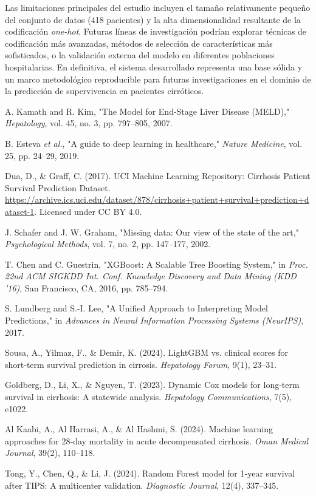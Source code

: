 \documentclass[journal]{IEEEtai}
\begin{document}
Las limitaciones principales del estudio incluyen el tamaño relativamente pequeño del conjunto de datos (418 pacientes) y la alta dimensionalidad resultante de la codificación \textit{one-hot}. Futuras líneas de investigación podrían explorar técnicas de codificación más avanzadas, métodos de selección de características más sofisticados, o la validación externa del modelo en diferentes poblaciones hospitalarias. En definitiva, el sistema desarrollado representa una base sólida y un marco metodológico reproducible para futuras investigaciones en el dominio de la predicción de supervivencia en pacientes cirróticos.

\begin{thebibliography}{1}

A. Kamath and R. Kim, "The Model for End-Stage Liver Disease (MELD)," \textit{Hepatology}, vol. 45, no. 3, pp. 797--805, 2007.

B. Esteva \textit{et al.}, "A guide to deep learning in healthcare," \textit{Nature Medicine}, vol. 25, pp. 24--29, 2019.

Dua, D., \& Graff, C. (2017). UCI Machine Learning Repository: Cirrhosis Patient Survival Prediction Dataset.
\url{https://archive.ics.uci.edu/dataset/878/cirrhosis+patient+survival+prediction+dataset-1}. Licensed under CC BY 4.0.

J. Schafer and J. W. Graham, "Missing data: Our view of the state of the art," \textit{Psychological Methods}, vol. 7, no. 2, pp. 147--177, 2002.

T. Chen and C. Guestrin, "XGBoost: A Scalable Tree Boosting System," in \textit{Proc. 22nd ACM SIGKDD Int. Conf. Knowledge Discovery and Data Mining (KDD '16)}, San Francisco, CA, 2016, pp. 785--794.

S. Lundberg and S.-I. Lee, "A Unified Approach to Interpreting Model Predictions," in \textit{Advances in Neural Information Processing Systems (NeurIPS)}, 2017.

Sousa, A., Yilmaz, F., \& Demir, K. (2024). LightGBM vs. clinical scores for short‑term survival prediction in cirrosis. \textit{Hepatology Forum}, 9(1), 23–31.

Goldberg, D., Li, X., \& Nguyen, T. (2023). Dynamic Cox models for long‑term survival in cirrhosis: A statewide analysis. \textit{Hepatology Communications}, 7(5), e1022.

Al Kaabi, A., Al Harrasi, A., \& Al Hashmi, S. (2024). Machine learning approaches for 28‑day mortality in acute decompensated cirrhosis. \textit{Oman Medical Journal}, 39(2), 110–118.

Tong, Y., Chen, Q., \& Li, J. (2024). Random Forest model for 1‑year survival after TIPS: A multicenter validation. \textit{Diagnostic Journal}, 12(4), 337–345.

\end{thebibliography}
\end{document}
